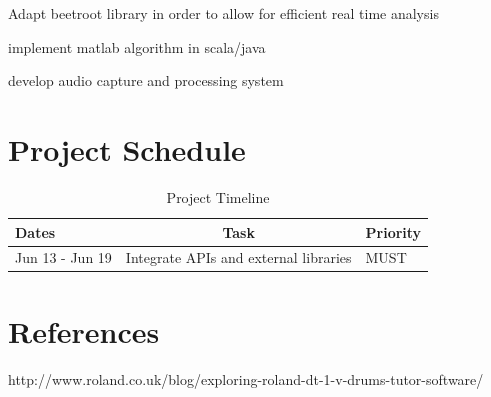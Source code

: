 \documentclass[a4paper, 11pt]{article}
\begin{document}
Adapt beetroot library in order to allow for efficient real time analysis

implement matlab algorithm in scala/java

develop audio capture and processing system 

\maketitle{} 
\section{Project Schedule}

\begin{table}[H]
\caption{Project Timeline} 
\centering
\begin{tabular}{ | L |c| L |}
\hline\hline 
Dates & Task & Priority\\ [0.5ex]
\hline 
Jun 13 - Jun 19 & Integrate APIs and external libraries & MUST
\end{tabular}
\label{stages} 
\end{table}

\maketitle{} 
\section{References}
http://www.roland.co.uk/blog/exploring-roland-dt-1-v-drums-tutor-software/
\end{document}
